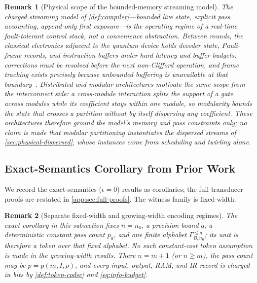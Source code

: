 \documentclass[a4paper,twocolumn,10pt,unpublished]{quantumarticle}
\newtheorem{remark}{Remark}
\begin{document}
\begin{remark}[Physical scope of the bounded-memory streaming model]
\label{rem:streaming-grounding}
The charged streaming model of \cref{def:compiler}---bounded live
state, explicit pass accounting, append-only first exposure---is the
operating regime of a real-time fault-tolerant control stack, not a
convenience abstraction.  Between rounds, the classical electronics
adjacent to the quantum device holds decoder state, Pauli-frame
records, and instruction buffers under hard latency and buffer
budgets: corrections must be resolved before the next non-Clifford
operation, and frame tracking exists precisely because unbounded
buffering is unavailable at that
boundary~\cite{riesebos2017pauli,watkins2024surfacecode}.  Distributed
and modular architectures motivate the same scope from the
interconnect side: a cross-module interaction splits the
\emph{support} of a gate across modules while its coefficient stays
within one module, so modularity bounds the state that crosses a
partition without by itself dispersing any coefficient.  These
architectures therefore ground the model's memory and pass
constraints only; no claim is made that modular partitioning
instantiates the dispersed streams of \cref{sec:physical-dispersed},
whose instances come from scheduling and twirling alone.
\end{remark}

\subsection{Exact-Semantics Corollary from Prior Work}

We record the exact-semantics ($\epsilon = 0$) results
as corollaries; the full transducer proofs are
restated in \cref{app:sec:full-proofs}. The witness family is
fixed-width.

\begin{remark}[Separate fixed-width and growing-width encoding regimes]
\label{rem:encoding-regimes}
The exact corollary in this subsection fixes $n=n_0$, a precision bound
$q$, a deterministic constant pass count $p_0$, and one finite alphabet
$\Gamma_{B,n_0}^{\leq q}$; its unit is therefore a token over that fixed
alphabet.  No such constant-cost token assumption is made in the
growing-width results.  There $n=m+1$ (or $n\geq m$), the pass count may be
$p=p(m,I,\rho)$, and every input, output, RAM, and IR record is charged in
bits by \cref{def:token-codec} and \eqref{eq:info-budget}.
\end{remark}
\end{document}
